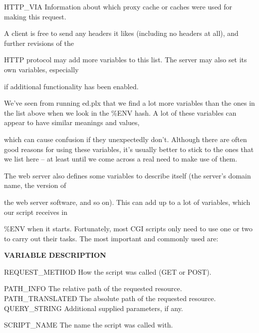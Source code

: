 \documentclass[a4paper,11pt]{book}
\begin{document}
\noindent 

\noindent HTTP\_VIA Information about which proxy cache or caches were used for making this request.

\noindent 

\noindent 

\noindent A client is free to send any headers it likes (including no headers at all), and further revisions of the

\noindent HTTP protocol may add more variables to this list. The server may also set its own variables, especially

\noindent if additional functionality has been enabled.

\noindent 

\noindent We've seen from running ed.plx that we find a lot more variables than the ones in the list above when we look in the \%ENV hash. A lot of these variables can appear to have similar meanings and values,

\noindent which can cause confusion if they unexpectedly don't. Although there are often good reasons for using these variables, it's usually better to stick to the ones that we list here -- at least until we come across a real need to make use of them.

\noindent 

\noindent 

\noindent The web server also defines some variables to describe itself (the server's domain name, the version of

\noindent the web server software, and so on). This can add up to a lot of variables, which our script receives in

\noindent \%ENV when it starts. Fortunately, most CGI scripts only need to use one or two to carry out their tasks. The most important and commonly used are:

\noindent 

\noindent 

\noindent \textbf{VARIABLE DESCRIPTION}

\noindent 

\noindent REQUEST\_METHOD How the script was called (GET or POST).

\noindent 

\noindent PATH\_INFO The relative path of the requested resource. PATH\_TRANSLATED The absolute path of the requested resource. QUERY\_STRING Additional supplied parameters, if any.

\noindent SCRIPT\_NAME The name the script was called with.
\end{document}
